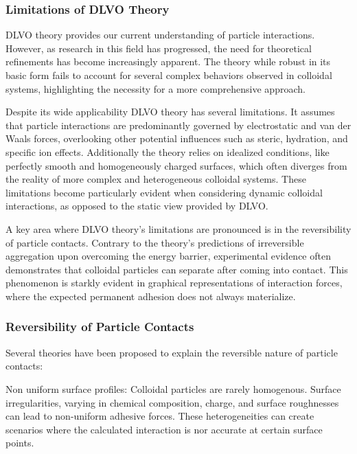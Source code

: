 

%

\subsubsection{Limitations of DLVO Theory}

DLVO theory provides our current understanding of particle interactions. However, as research in this field has progressed, the need for theoretical refinements has become increasingly apparent. The theory while robust in its basic form fails to account for several complex behaviors observed in colloidal systems, highlighting the necessity for a more comprehensive approach.

Despite its wide applicability DLVO theory has several limitations. It assumes that particle interactions are predominantly governed by electrostatic and van der Waals forces, overlooking other potential influences such as steric, hydration, and specific ion effects. Additionally the theory relies on idealized conditions, like perfectly smooth and homogeneously charged surfaces, which often diverges from the reality of more complex and heterogeneous colloidal systems. These limitations become particularly evident when considering dynamic colloidal interactions, as opposed to the static view provided by DLVO.

A key area where DLVO theory's limitations are pronounced is in the reversibility of particle contacts. Contrary to the theory's predictions of irreversible aggregation upon overcoming the energy barrier, experimental evidence often demonstrates that colloidal particles can separate after coming into contact. \cite{DNACollid} This phenomenon is starkly evident in graphical representations of interaction forces, where the expected permanent adhesion does not always materialize.

\subsubsection{Reversibility of Particle Contacts}

Several theories have been proposed to explain the reversible nature of particle contacts:

Non uniform surface profiles: Colloidal particles are rarely homogenous. Surface irregularities, varying in chemical composition, charge, and surface roughnesses can lead to non-uniform adhesive forces. These heterogeneities can create scenarios where the calculated interaction is nor accurate at certain surface points.

